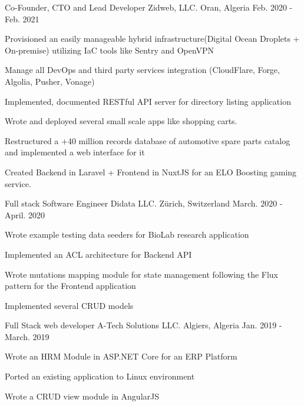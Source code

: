\begin{cventries}
  \cventry
    {Co-Founder, CTO and Lead Developer} %
    {Zidweb, LLC.} %
    {Oran, Algeria} %
    {Feb. 2020 - Feb. 2021} %
    {
      \begin{cvitems} %
        \item {Provisioned an easily manageable hybrid infrastructure(Digital Ocean Droplets + On-premise) utilizing IaC tools like Sentry and OpenVPN}
        \item {Manage all DevOps and third party services integration (CloudFlare, Forge, Algolia, Pusher, Vonage)}
        \item {Implemented, documented RESTful API server for directory listing application}
        \item {Wrote and deployed several small scale apps like shopping carts.}
        \item {Restructured a +40 million records database of automotive spare parts catalog and implemented a web interface for it}
        \item {Created Backend in Laravel + Frontend in NuxtJS for an ELO Boosting gaming service.}
      \end{cvitems}
    }

  \cventry
    {Full stack Software Engineer} %
    {Didata LLC.} %
    {Zürich, Switzerland} %
    {March. 2020 - April. 2020} %
    {
      \begin{cvitems} %
        \item {Wrote example testing data seeders for BioLab research application}
        \item {Implemented an ACL architecture for Backend API}
        \item {Wrote mutations mapping module for state management following the Flux pattern for the Frontend application}
        \item {Implemented several CRUD models}
      \end{cvitems}
    }

  \cventry
    {Full Stack web developer} %
    {A-Tech Solutions LLC.} %
    {Algiers, Algeria} %
    {Jan. 2019 - March. 2019} %
    {
      \begin{cvitems} %
        \item {Wrote an HRM Module in ASP.NET Core for an ERP Platform}
        \item {Ported an existing application to Linux environment}
        \item {Wrote a CRUD view module in AngularJS}
      \end{cvitems}
    }


\end{cventries}
